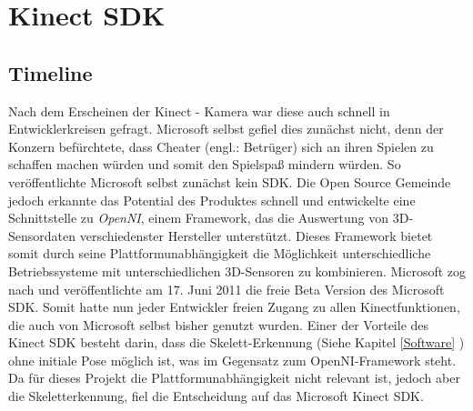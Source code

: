 \section{Kinect SDK}\label{SDK}
%
%
%
%
%
%

	
\subsection{Timeline}
Nach dem Erscheinen der Kinect - Kamera war diese auch schnell in Entwicklerkreisen gefragt. Microsoft selbst gefiel dies zunächst nicht, denn der Konzern befürchtete, dass Cheater (engl.: Betrüger) sich an ihren Spielen zu schaffen machen würden und somit den Spielspaß mindern würden. So veröffentlichte Microsoft selbst zunächst kein SDK. Die Open Source Gemeinde jedoch erkannte das Potential des Produktes schnell und entwickelte eine Schnittstelle zu \textit{OpenNI}, einem Framework, das die Auswertung von 3D-Sensordaten verschiedenster Hersteller unterstützt. Dieses Framework bietet somit durch seine Plattformunabhängigkeit die Möglichkeit unterschiedliche Betriebssysteme mit unterschiedlichen 3D-Sensoren zu kombinieren.\cite{webb2012beginning}
Microsoft zog nach und veröffentlichte am 17. Juni 2011 die freie Beta Version des Microsoft SDK. Somit hatte nun jeder Entwickler freien Zugang zu allen Kinectfunktionen, die auch von Microsoft selbst bisher genutzt wurden. Einer der Vorteile des Kinect SDK besteht darin, dass die Skelett-Erkennung (Siehe Kapitel \ref{Software} ) ohne initiale Pose möglich ist, was im Gegensatz zum OpenNI-Framework steht. \cite{webb2012beginning} Da für dieses Projekt die Plattformunabhängigkeit nicht relevant ist, jedoch aber die Skeletterkennung, fiel die Entscheidung auf das Microsoft Kinect SDK.

